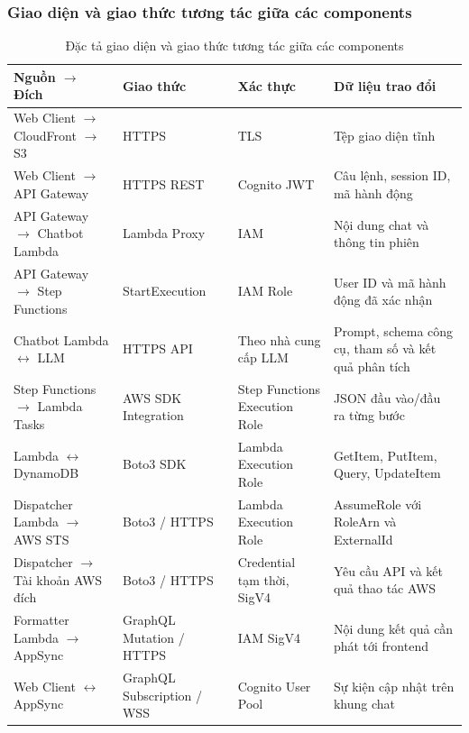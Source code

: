 \documentclass[a4paper,12pt]{article}
\begin{document}
\subsubsection{Giao diện và giao thức tương tác giữa các components}
\begin{table}[H]
\centering
\caption{Đặc tả giao diện và giao thức tương tác giữa các components}
\label{tab:inter_service_interfaces}
\begingroup
\renewcommand{\arraystretch}{1.12}
\fontsize{8.5}{11.2}\selectfont
\begin{tabularx}{\linewidth}{@{}>{\raggedright\arraybackslash}p{4.1cm}>{\raggedright\arraybackslash}p{2.35cm}>{\raggedright\arraybackslash}p{3.05cm}Y@{}}
\toprule
\textbf{Nguồn $\rightarrow$ Đích} & \textbf{Giao thức} & \textbf{Xác thực} & \textbf{Dữ liệu trao đổi}\\
\midrule
Web Client $\rightarrow$ CloudFront $\rightarrow$ S3 & HTTPS & TLS & Tệp giao diện tĩnh\\
Web Client $\rightarrow$ API Gateway & HTTPS REST & Cognito JWT & Câu lệnh, session ID, mã hành động\\
API Gateway $\rightarrow$ Chatbot Lambda & Lambda Proxy & IAM & Nội dung chat và thông tin phiên\\
API Gateway $\rightarrow$ Step Functions & StartExecution & IAM Role & User ID và mã hành động đã xác nhận\\
Chatbot Lambda $\leftrightarrow$ LLM & HTTPS API & Theo nhà cung cấp LLM & Prompt, schema công cụ, tham số và kết quả phân tích\\
Step Functions $\rightarrow$ Lambda Tasks & AWS SDK Integration & Step Functions Execution Role & JSON đầu vào/đầu ra từng bước\\
Lambda $\leftrightarrow$ DynamoDB & Boto3 SDK & Lambda Execution Role & GetItem, PutItem, Query, UpdateItem\\
Dispatcher Lambda $\rightarrow$ AWS STS & Boto3 / HTTPS & Lambda Execution Role & AssumeRole với RoleArn và ExternalId\\
Dispatcher $\rightarrow$ Tài khoản AWS đích & Boto3 / HTTPS & Credential tạm thời, SigV4 & Yêu cầu API và kết quả thao tác AWS\\
Formatter Lambda $\rightarrow$ AppSync & GraphQL Mutation / HTTPS & IAM SigV4 & Nội dung kết quả cần phát tới frontend\\
Web Client $\leftrightarrow$ AppSync & GraphQL Subscription / WSS & Cognito User Pool & Sự kiện cập nhật trên khung chat\\
\bottomrule
\end{tabularx}
\endgroup
\end{table}
\end{document}
